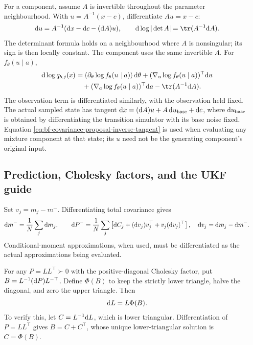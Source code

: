 For a component, assume \(A\) is invertible throughout the
parameter neighbourhood. With \(u=A^{-1}(x-c)\), differentiate \(Au=x-c\):
\begin{equation}
\label{eq:bf-covariance-proposal-inverse-tangent}
 \bfCovDiff u=A^{-1}(\bfCovDiff x-\bfCovDiff c-(\bfCovDiff A)u),\qquad
 \bfCovDiff\log|\det A|=\tr(A^{-1}\bfCovDiff A).
\end{equation}
The determinant formula holds on a neighbourhood where \(A\) is
nonsingular; its sign is then locally constant. The component uses the same invertible \(A\).
For \(f_\theta(u\mid a)\),
\begin{equation}
\label{eq:bf-covariance-proposal-component-tangent}
 \begin{aligned}
 \bfCovDiff\log q_{b,j}(x)
 &=(\partial_\theta\log f_\theta(u\mid a))\,\bfCovDiff\theta
  +(\nabla_u\log f_\theta(u\mid a))^\top\bfCovDiff u\\
 &\quad +(\nabla_a\log f_\theta(u\mid a))^\top\bfCovDiff a
  -\tr(A^{-1}\bfCovDiff A).
 \end{aligned}
\end{equation}
The observation term is differentiated similarly, with the observation
held fixed. The actual sampled state has tangent
\(\mathrm d x=(\mathrm d A)u+A\,\mathrm d u_{\rm base}+\mathrm d c\), where
\(\mathrm d u_{\rm base}\) is obtained by differentiating the transition simulator
with its base noise fixed. Equation \eqref{eq:bf-covariance-proposal-inverse-tangent} is used
when evaluating any mixture component at that state; its \(u\) need not
be the generating component's original input.

\subsection{Prediction, Cholesky factors, and the UKF guide}

Set \(v_j=m_j-m^-\). Differentiating total covariance gives
\begin{equation}
\label{eq:bf-covariance-proposal-prediction-tangent}
 \mathrm d m^-=\frac1N\sum_j\mathrm d m_j,\qquad
 \mathrm d P^-=\frac1N\sum_j\left[
 \mathrm d C_j+(\mathrm d v_j)v_j^\top+v_j(\mathrm d v_j)^\top\right],
 \quad \mathrm d v_j=\mathrm d m_j-\mathrm d m^-.
\end{equation}
Conditional-moment approximations, when used, must be differentiated as
the actual approximations being evaluated.

For any \(P=LL^\top\succ0\) with the positive-diagonal Cholesky factor,
put \(B=L^{-1}(\mathrm d P)L^{-\top}\). Define \(\Phi(B)\) to keep the strictly
lower triangle, halve the diagonal, and zero the upper triangle. Then
\begin{equation}
\label{eq:bf-covariance-proposal-chol-tangent}
 \mathrm d L=L\Phi(B).
\end{equation}
To verify this, let \(C=L^{-1}\mathrm d L\), which is lower triangular.
Differentiation of \(P=LL^\top\) gives \(B=C+C^\top\), whose unique
lower-triangular solution is \(C=\Phi(B)\).


